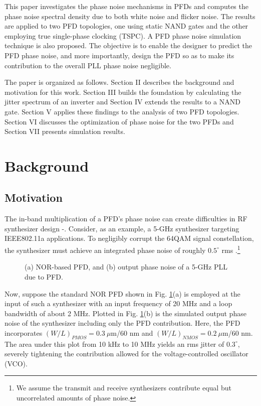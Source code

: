 This paper investigates the phase noise mechanisms in PFDs and computes the phase noise spectral density due to both white noise and flicker
noise. The results are applied to two PFD topologies, one using static NAND gates and the other employing true single-phase clocking (TSPC). A PFD
phase noise simulation technique is also proposed. The objective is to enable the designer to predict the PFD phase noise, and more importantly,
design the PFD so as to make its contribution to the overall PLL phase noise negligible.

The paper is organized as follows. Section II describes the background and motivation for this work. Section III builds the foundation by
calculating the jitter spectrum of an inverter and Section IV extends the results to a NAND gate. Section V applies
these findings to the analysis of two PFD topologies. Section VI discusses the optimization of phase noise for the two PFDs and Section VII
presents simulation results.




\section{Background}
\subsection{Motivation}
The in-band multiplication of a PFD's phase noise can create difficulties in RF synthesizer design \cite{Tsutsumi}-\cite{Wilson}. Consider, as an example, a
5-GHz synthesizer targeting IEEE802.11a applications. To negligibly corrupt the 64QAM signal constellation, the synthesizer
must achieve an integrated phase noise of roughly $0.5^\circ$ rms \cite{Chen}.\footnote{We assume the transmit and
receive synthesizers contribute equal but uncorrelated amounts of phase noise.}
\begin{figure}[htb]
\vspace{2.9in}
\vspace{2.3in}
\caption{(a) NOR-based PFD, and (b) output phase noise of a 5-GHz PLL due to PFD.}
\label{pfdnor}
\end{figure} 
Now, suppose the standard NOR PFD shown in Fig. \ref{pfdnor}(a) is employed at the input of such a synthesizer with an input
frequency of 20 MHz and a loop bandwidth of about 2 MHz. Plotted in Fig. \ref{pfdnor}(b) is the simulated output phase noise of
the synthesizer including only the PFD contribution. Here, the PFD incorporates $(W/L)_{PMOS}=0.3\ \mu$m/60 nm and
$(W/L)_{NMOS}=0.2\ \mu$m/60 nm. The area under this plot from 10 kHz to 10 MHz yields an rms jitter of $0.3^\circ$, severely tightening the
contribution allowed for the voltage-controlled oscillator (VCO).

